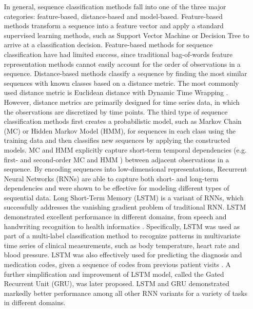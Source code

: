 \documentclass{amia_summit_2018}
\begin{document}
In general, sequence classification methods fall into one of the three major categories: feature-based, distance-based and model-based. Feature-based methods transform a sequence into a feature
vector and apply a standard supervised learning methods, such as Support Vector Machine \cite{leslie2004fast} or Decision Tree \cite{chuzhanova1998feature} to arrive at a classification decision.
Feature-based methods for sequence classification have had limited success, since traditional bag-of-words feature representation methods cannot easily account for the order of observations in a
sequence.
Distance-based methods classify a sequence by finding the most similar sequences with known classes based on a distance metric. The most commonly used distance metric is
Euclidean distance with Dynamic Time Wrapping \cite{keogh2000scaling}. However, distance metrics are primarily designed for time series data, in which the observations are discretized by time points.
The third type of sequence classification methods first creates a probabilistic model, such as Markov Chain (MC) or Hidden Markov Model \cite{rabiner1989tutorial} (HMM), for sequences in each class
using the training data and then classifies new sequences by applying the constructed models. MC and HMM explicitly capture short-term temporal dependencies (e.g. first- and second-order MC and HMM
\cite{kundu1988recognition}) between adjacent observations in a sequence. By encoding sequences into low-dimensional representations, Recurrent Neural Networks (RNNs) are able to capture both short-
and long-term dependencies and were shown to be effective for modeling different types of sequential data. Long Short-Term Memory (LSTM) \cite{hochreiter1997long} is a variant of RNNs, which
successfully addresses the vanishing gradient problem \cite{bengio1993problem} of traditional RNN. LSTM demonstrated excellent performance in different domains, from speech \cite{graves2013speech} and
handwriting \cite{nion2013handwritten} recognition to health informatics \cite{lipton2015learning, choi2016doctor}. Specifically, LSTM was used as part of a multi-label classification method to
recognize patterns in multivariate time series of clinical measurements, such as body temperature, heart rate and blood pressure\cite{lipton2015learning}. LSTM was also effectively used for predicting
the diagnosis and medication codes, given a sequence of codes from previous patient visits \cite{choi2016doctor}. A further simplification and improvement of LSTM model, called the Gated Recurrent
Unit\cite{chung2014empirical} (GRU), was later proposed. LSTM and GRU demonstrated markedly better performance among all other RNN variants for a variety of tasks in different domains.
  
\end{document}
